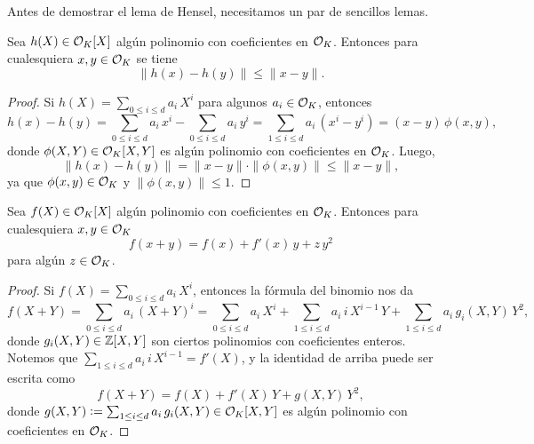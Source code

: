 \documentclass{article}
\numberwithin{equation}{section}
\theoremstyle{definition}
\begin{document}
Antes de demostrar el lema de Hensel, necesitamos un par de sencillos lemas.

\begin{lema}
  \label{lema:Hensel-lema-2}
  Sea $h (X) \in \mathcal{O}_K [X]$ algún polinomio con coeficientes en $\mathcal{O}_K$. Entonces
  para cualesquiera $x,y\in \mathcal{O}_K$ se tiene
  $$\|h (x) - h (y)\| \le \|x-y\|.$$

  \begin{proof}
    Si $h (X) = \sum_{0 \le i \le d} a_i\,X^i$ para algunos $a_i\in \mathcal{O}_K$,
    entonces
    \[ h (x) - h (y) = \sum_{0 \le i \le d} a_i\,x^i - \sum_{0 \le i \le d}
       a_i\,y^i = \sum_{1 \le i \le d} a_i\,(x^i - y^i) = (x-y)\,\phi (x,y), \]
    donde $\phi (X,Y) \in \mathcal{O}_K [X,Y]$ es algún polinomio con coeficientes en
    $\mathcal{O}_K$. Luego,
    $$\|h (x) - h (y)\| = \|x-y\|\cdot \|\phi (x,y)\| \le \|x-y\|,$$
    ya que $\phi (x,y) \in \mathcal{O}_K$ y $\|\phi (x,y)\| \le 1$.
  \end{proof}
\end{lema}

\begin{lema}
  \label{lema:Hensel-lema-1}
  Sea $f (X) \in \mathcal{O}_K [X]$ algún polinomio con coeficientes en $\mathcal{O}_K$. Entonces
  para cualesquiera $x,y\in \mathcal{O}_K$
  $$f (x+y) = f (x) + f' (x)\,y + z\,y^2$$
  para algún $z\in \mathcal{O}_K$.

  \begin{proof}
    Si $f (X) = \sum_{0 \le i \le d} a_i\,X^i$, entonces la fórmula del binomio
    nos da
    \[ f (X+Y) =
       \sum_{0 \le i \le d} a_i\,(X+Y)^i =
       \sum_{0 \le i \le d} a_i\,X^i + \sum_{1 \le i \le d} a_i\,i\,X^{i-1}\,Y +
           \sum_{1 \le i \le d} a_i\,g_i (X,Y)\,Y^2, \]
    donde $g_i (X,Y) \in \mathbb{Z} [X,Y]$ son ciertos polinomios con coeficientes
    enteros. Notemos que $\sum_{1 \le i \le d} a_i\,i\,X^{i-1} = f' (X)$,
    y la identidad de arriba puede ser escrita como
    $$f (X+Y) = f (X) + f' (X)\,Y + g (X,Y)\,Y^2,$$
    donde $g (X,Y) \mathrel{\mathop:}= \sum_{1 \le i \le d} a_i\,g_i (X,Y) \in \mathcal{O}_K [X,Y]$ es
    algún polinomio con coeficientes en $\mathcal{O}_K$.
  \end{proof}
\end{lema}
\end{document}
